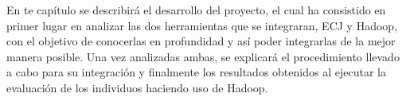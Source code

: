 En te cap\'itulo se describir\'a el desarrollo del proyecto, el cual ha consistido en primer lugar en analizar las dos herramientas que se integraran, ECJ y Hadoop, con el objetivo de conocerlas en profundidad y as\'i poder integrarlas de la mejor manera posible. Una vez analizadas ambas, se explicar\'a el procedimiento llevado a cabo para su integración y finalmente los resultados obtenidos al ejecutar la evaluación de los individuos haciendo uso de Hadoop.